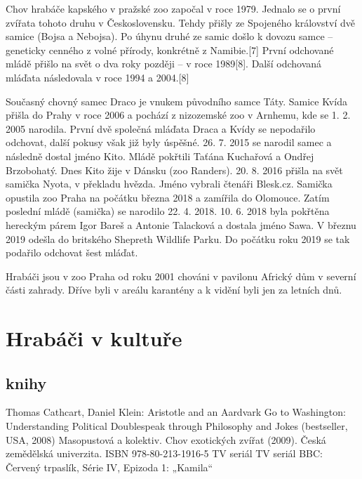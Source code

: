 \documentclass[a4paper, 12pt]{article}
\begin{document}
Chov hrabáče kapského v pražské zoo započal v roce 1979. Jednalo se o první zvířata tohoto druhu v Československu. Tehdy přišly ze Spojeného království dvě samice (Bojsa a Nebojsa). Po úhynu druhé ze samic došlo k dovozu samce – geneticky cenného z volné přírody, konkrétně z Namibie.[7] První odchované mládě přišlo na svět o dva roky později – v roce 1989[8]. Další odchovaná mláďata následovala v roce 1994 a 2004.[8]

Současný chovný samec Draco je vnukem původního samce Táty.
Samice Kvída přišla do Prahy v roce 2006 a pochází z nizozemské zoo v Arnhemu, kde se 1. 2. 2005 narodila.
První dvě společná mláďata Draca a Kvídy se nepodařilo odchovat, další pokusy však již byly úspěšné. 26. 7. 2015 se narodil samec a následně dostal jméno Kito.
Mládě pokřtili Taťána Kuchařová a Ondřej Brzobohatý. Dnes Kito žije v Dánsku (zoo Randers). 20. 8. 2016 přišla na svět samička Nyota, v překladu hvězda.
Jméno vybrali čtenáři Blesk.cz. Samička opustila zoo Praha na počátku března 2018 a zamířila do Olomouce. Zatím poslední mládě (samička) se narodilo 22. 4. 2018.
10. 6. 2018 byla pokřtěna hereckým párem Igor Bareš a Antonie Talacková a dostala jméno Sawa. V březnu 2019 odešla do britského Shepreth Wildlife Parku. Do počátku roku 2019 se tak podařilo odchovat šest mláďat.

Hrabáči jsou v zoo Praha od roku 2001 chováni v pavilonu Africký dům v severní části zahrady. Dříve byli v areálu karantény a k vidění byli jen za letních dnů.

\section{Hrabáči v kultuře}

\subsection{knihy}

Thomas Cathcart, Daniel Klein: Aristotle and an Aardvark Go to Washington: Understanding Political Doublespeak through Philosophy and Jokes (bestseller, USA, 2008)
Masopustová a kolektiv. Chov exotických zvířat (2009). Česká zemědělská univerzita. ISBN 978-80-213-1916-5
TV seriál
TV seriál BBC: Červený trpaslík, Série IV, Epizoda 1: „Kamila“
\end{document}
